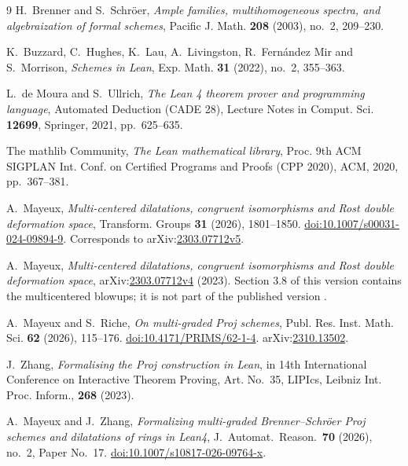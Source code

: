 \documentclass[pdflatex,sn-mathphys-num]{sn-jnl}
\theoremstyle{plain}
\theoremstyle{definition}
\begin{document}
\begin{thebibliography}{9}
H.~Brenner and S.~Schr\"oer,
\emph{Ample families, multihomogeneous spectra, and algebraization of formal
schemes},
Pacific J. Math. \textbf{208} (2003), no.~2, 209--230.

K.~Buzzard, C.~Hughes, K.~Lau, A.~Livingston, R.~Fern\'andez Mir and S.~Morrison,
\emph{Schemes in Lean},
Exp. Math. \textbf{31} (2022), no.~2, 355--363.

L.~de Moura and S.~Ullrich,
\emph{The Lean 4 theorem prover and programming language},
Automated Deduction (CADE 28), Lecture Notes in Comput. Sci. \textbf{12699},
Springer, 2021, pp.~625--635.

The mathlib Community,
\emph{The Lean mathematical library},
Proc. 9th ACM SIGPLAN Int. Conf. on Certified Programs and Proofs (CPP 2020),
ACM, 2020, pp.~367--381.

A.~Mayeux,
\emph{Multi-centered dilatations, congruent isomorphisms and Rost double
deformation space},
Transform. Groups \textbf{31} (2026), 1801--1850.
\href{https://doi.org/10.1007/s00031-024-09894-9}{doi:10.1007/s00031-024-09894-9}.
Corresponds to arXiv:\href{https://arxiv.org/abs/2303.07712v5}{2303.07712v5}.

A.~Mayeux,
\emph{Multi-centered dilatations, congruent isomorphisms and Rost double
deformation space},
arXiv:\href{https://arxiv.org/abs/2303.07712v4}{2303.07712v4} (2023).
Section 3.8 of this version contains the multicentered blowups; it is not
part of the published version \cite{mayeux-dilatations}.

A.~Mayeux and S.~Riche,
\emph{On multi-graded Proj schemes},
Publ. Res. Inst. Math. Sci. \textbf{62} (2026), 115--176.
\href{https://doi.org/10.4171/PRIMS/62-1-4}{doi:10.4171/PRIMS/62-1-4}.
arXiv:\href{https://arxiv.org/abs/2310.13502}{2310.13502}.

J.~Zhang,
\emph{Formalising the Proj construction in Lean},
in 14th International Conference on Interactive Theorem Proving,
Art. No.~35, LIPIcs, Leibniz Int. Proc. Inform., \textbf{268} (2023).

A.~Mayeux and J.~Zhang,
\emph{Formalizing multi-graded Brenner--Schr\"oer Proj schemes and dilatations
of rings in Lean4},
J.\ Automat.\ Reason.\ \textbf{70} (2026), no.~2, Paper No.~17.
\href{https://doi.org/10.1007/s10817-026-09764-x}{doi:10.1007/s10817-026-09764-x}.


\end{thebibliography}
\end{document}
